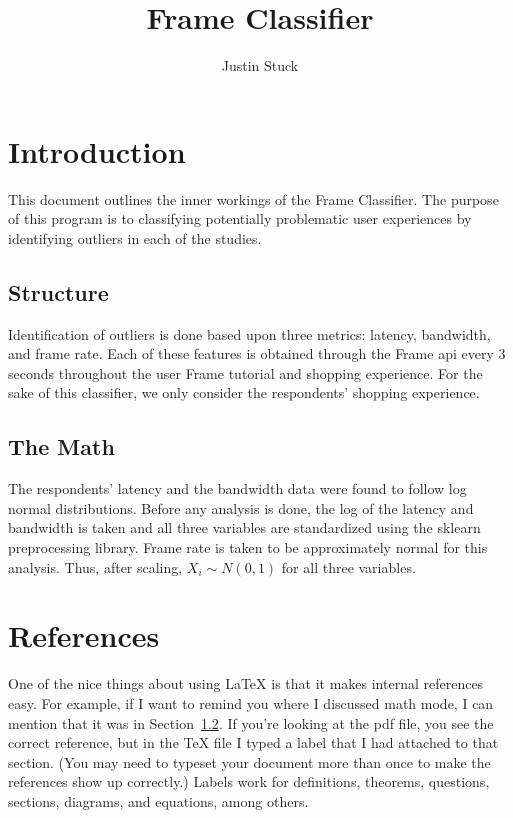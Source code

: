 \documentclass[11pt]{article}
\theoremstyle{plain}
\theoremstyle{definition}
\begin{document}
 


\title{Frame Classifier}
\author{Justin Stuck}
\maketitle

\section{Introduction}

This document outlines the inner workings of the Frame Classifier. The purpose of this program is to classifying potentially problematic user experiences by identifying outliers in each of the studies. 

\subsection{Structure}
Identification of outliers is done based upon three metrics: latency, bandwidth, and frame rate. Each of these features is obtained through the Frame api every 3 seconds throughout the user Frame tutorial and shopping experience. For the sake of this classifier, we only consider the respondents' shopping experience.

\subsection{The Math}\label{section:mathmode}

The respondents' latency and the bandwidth data were found to follow log normal distributions. Before any analysis is done, the log of the latency and bandwidth is taken and all three variables are standardized using the sklearn preprocessing library.
Frame rate is taken to be approximately normal for this analysis. Thus, after scaling, $X_i\sim\textit{N}(0,1)$ for all three variables. 


\section{References}
One of the nice things about using LaTeX is that it makes internal references easy.  For example, if I want to remind you where I discussed math mode, I can mention that it was in Section~\ref{section:mathmode}.  If you're looking at the pdf file, you see the correct reference, but in the TeX file I typed a label that I had attached to that section.  (You may need to typeset your document more than once to make the references show up correctly.)  Labels work for definitions, theorems, questions, sections, diagrams, and equations, among others.

 
 
\end{document}

